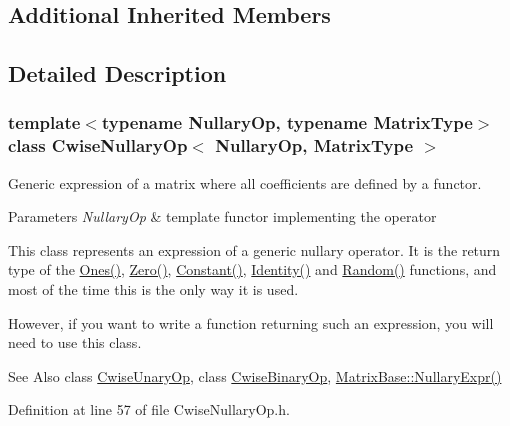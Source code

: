 \subsection*{Additional Inherited Members}


\subsection{Detailed Description}
\subsubsection*{template$<$typename Nullary\-Op, typename Matrix\-Type$>$class Cwise\-Nullary\-Op$<$ Nullary\-Op, Matrix\-Type $>$}

Generic expression of a matrix where all coefficients are defined by a functor. 


\begin{DoxyParams}{Parameters}
{\em Nullary\-Op} & template functor implementing the operator\\
\hline
\end{DoxyParams}
This class represents an expression of a generic nullary operator. It is the return type of the \hyperlink{class_matrix_base_a6ea7fe1ebd5eb078bcafa2c00d5c4021}{Ones()}, \hyperlink{class_matrix_base_a80d399408db12eb60957efa2d7e8d4a9}{Zero()}, \hyperlink{class_matrix_base_a06986b94e4841f54bb8c6bd9473f0798}{Constant()}, \hyperlink{class_matrix_base_ae099ba9697a9989d827169994bd5728d}{Identity()} and \hyperlink{class_matrix_base_afaba6ac3461ed7f6bcdb2c877bc62b93}{Random()} functions, and most of the time this is the only way it is used.

However, if you want to write a function returning such an expression, you will need to use this class.

\begin{DoxySeeAlso}{See Also}
class \hyperlink{class_cwise_unary_op}{Cwise\-Unary\-Op}, class \hyperlink{class_cwise_binary_op}{Cwise\-Binary\-Op}, \hyperlink{class_matrix_base_abbe8a3418394b62b12ac1e965e34aabc}{Matrix\-Base\-::\-Nullary\-Expr()} 
\end{DoxySeeAlso}


Definition at line 57 of file Cwise\-Nullary\-Op.\-h.




